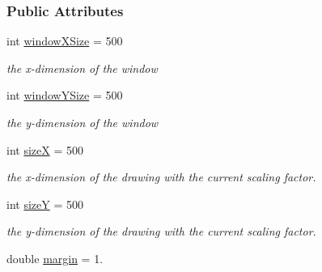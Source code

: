 \subsubsection*{Public Attributes}
\begin{DoxyCompactItemize}
\item 
int \hyperlink{structGraphics_a08ef5c048c2699a1bd2ee000eb9a5632}{window\+X\+Size} = 500\hypertarget{structGraphics_a08ef5c048c2699a1bd2ee000eb9a5632}{}\label{structGraphics_a08ef5c048c2699a1bd2ee000eb9a5632}

\begin{DoxyCompactList}\small\item\em the x-\/dimension of the window \end{DoxyCompactList}\item 
int \hyperlink{structGraphics_ad3851ef75738fa79ac8942df532f2b16}{window\+Y\+Size} = 500\hypertarget{structGraphics_ad3851ef75738fa79ac8942df532f2b16}{}\label{structGraphics_ad3851ef75738fa79ac8942df532f2b16}

\begin{DoxyCompactList}\small\item\em the y-\/dimension of the window \end{DoxyCompactList}\item 
int \hyperlink{structGraphics_a010c97c47dc7c138dbd967bff45ef05d}{sizeX} = 500\hypertarget{structGraphics_a010c97c47dc7c138dbd967bff45ef05d}{}\label{structGraphics_a010c97c47dc7c138dbd967bff45ef05d}

\begin{DoxyCompactList}\small\item\em the x-\/dimension of the drawing with the current scaling factor. \end{DoxyCompactList}\item 
int \hyperlink{structGraphics_ae901ea1e9a4b34bb67f460874255e8b1}{sizeY} = 500\hypertarget{structGraphics_ae901ea1e9a4b34bb67f460874255e8b1}{}\label{structGraphics_ae901ea1e9a4b34bb67f460874255e8b1}

\begin{DoxyCompactList}\small\item\em the y-\/dimension of the drawing with the current scaling factor. \end{DoxyCompactList}\item 
double \hyperlink{structGraphics_acbb032725cc5455962da4f08eda54dbf}{margin} = 1.\hypertarget{structGraphics_acbb032725cc5455962da4f08eda54dbf}{}\label{structGraphics_acbb032725cc5455962da4f08eda54dbf}


\end{DoxyCompactItemize}
